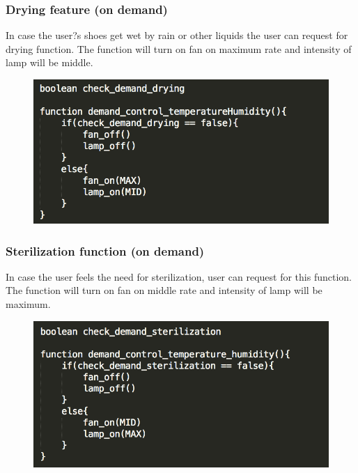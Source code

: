 \documentclass[conference]{IEEEtran}
\begin{document}
\subsubsection{Drying feature (on demand)}
In case the user?s shoes get wet by rain or other liquids the user can request for drying function. The function will turn on fan on maximum rate and intensity of lamp will be middle.
\begin{figure}[h]
\begin{center}
    \includegraphics[scale=0.6]{optimization2}
    \label{fig:label}
\end{center}
\end{figure}
\subsubsection{Sterilization function (on demand)}
In case the user feels the need for sterilization, user can request for this function. The function will turn on fan on middle rate and intensity of lamp will be maximum.
\begin{figure}[h]
\begin{center}
    \includegraphics[scale=0.6]{optimization3}
    \label{fig:label}
\end{center}
\end{figure}
\end{document}
